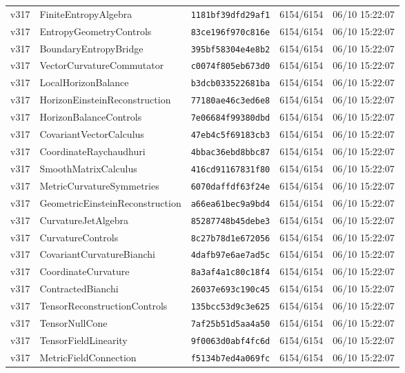 \documentclass[11pt]{article}
\theoremstyle{definition}\newtheorem{deriv}{Derivação}
\begin{document}
{\begin{longtable}{@{}lllll@{}}
v317 & FiniteEntropyAlgebra & \texttt{1181bf39dfd29af1} & 6154/6154 & 06/10 15:22:07 \\
v317 & EntropyGeometryControls & \texttt{83ce196f970c816e} & 6154/6154 & 06/10 15:22:07 \\
v317 & BoundaryEntropyBridge & \texttt{395bf58304e4e8b2} & 6154/6154 & 06/10 15:22:07 \\
v317 & VectorCurvatureCommutator & \texttt{c0074f805eb673d0} & 6154/6154 & 06/10 15:22:07 \\
v317 & LocalHorizonBalance & \texttt{b3dcb033522681ba} & 6154/6154 & 06/10 15:22:07 \\
v317 & HorizonEinsteinReconstruction & \texttt{77180ae46c3ed6e8} & 6154/6154 & 06/10 15:22:07 \\
v317 & HorizonBalanceControls & \texttt{7e06684f99380dbd} & 6154/6154 & 06/10 15:22:07 \\
v317 & CovariantVectorCalculus & \texttt{47eb4c5f69183cb3} & 6154/6154 & 06/10 15:22:07 \\
v317 & CoordinateRaychaudhuri & \texttt{4bbac36ebd8bbc87} & 6154/6154 & 06/10 15:22:07 \\
v317 & SmoothMatrixCalculus & \texttt{416cd91167831f80} & 6154/6154 & 06/10 15:22:07 \\
v317 & MetricCurvatureSymmetries & \texttt{6070daffdf63f24e} & 6154/6154 & 06/10 15:22:07 \\
v317 & GeometricEinsteinReconstruction & \texttt{a66ea61bec9a9bd4} & 6154/6154 & 06/10 15:22:07 \\
v317 & CurvatureJetAlgebra & \texttt{85287748b45debe3} & 6154/6154 & 06/10 15:22:07 \\
v317 & CurvatureControls & \texttt{8c27b78d1e672056} & 6154/6154 & 06/10 15:22:07 \\
v317 & CovariantCurvatureBianchi & \texttt{4dafb97e6ae7ad5c} & 6154/6154 & 06/10 15:22:07 \\
v317 & CoordinateCurvature & \texttt{8a3af4a1c80c18f4} & 6154/6154 & 06/10 15:22:07 \\
v317 & ContractedBianchi & \texttt{26037e693c190c45} & 6154/6154 & 06/10 15:22:07 \\
v317 & TensorReconstructionControls & \texttt{135bcc53d9c3e625} & 6154/6154 & 06/10 15:22:07 \\
v317 & TensorNullCone & \texttt{7af25b51d5aa4a50} & 6154/6154 & 06/10 15:22:07 \\
v317 & TensorFieldLinearity & \texttt{9f0063d0abf4fc6d} & 6154/6154 & 06/10 15:22:07 \\
v317 & MetricFieldConnection & \texttt{f5134b7ed4a069fc} & 6154/6154 & 06/10 15:22:07 \\

\end{longtable}}
\end{document}
